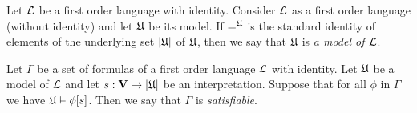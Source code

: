 \begin{definition}
Let ${\mathcal L}$ be a first order language with identity. Consider ${\mathcal L}$ as a first order language (without identity) and let ${\mathfrak U}$ be its model. If $=^{\mathfrak U}$ is the standard identity of elements of the underlying set $|{\mathfrak U}|$ of ${\mathfrak U}$, then we say that ${\mathfrak U}$ is \textit{a model of ${\mathcal L}$}.
\end{definition}

\begin{definition}
Let $\Gamma$ be a set of formulas of a first order language ${\mathcal L}$ with identity. Let ${\mathfrak U}$ be a model of ${\mathcal L}$ and let $s: \mathbf{V} \rightarrow |{\mathfrak U}|$ be an interpretation. Suppose that for all $\phi$ in $\Gamma$ we have ${\mathfrak U} \vDash \phi[s]$. Then we say that $\Gamma$ is \textit{satisfiable}.
\end{definition}

